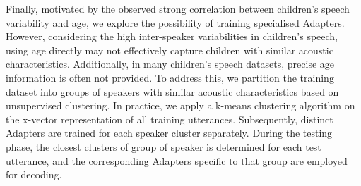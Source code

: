

Finally, motivated by the observed strong correlation between children's speech variability and age, we explore the possibility of training specialised Adapters. However, considering the high inter-speaker variabilities in children's speech, using age directly may not effectively capture children with similar acoustic characteristics. Additionally, in many children's speech datasets, precise age information is often not provided. To address this, we partition the training dataset into groups of speakers with similar acoustic characteristics based on unsupervised clustering.
In practice, we apply a k-means clustering algorithm on the x-vector representation \cite{snyder2018x} of all training utterances. Subsequently, distinct Adapters are trained for each speaker cluster separately. During the testing phase, the closest clusters of group of speaker is determined for each test utterance, and the corresponding Adapters specific to that group are employed for decoding.


